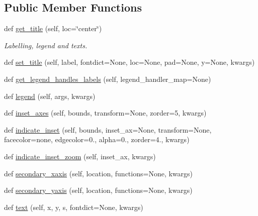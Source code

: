 \subsection*{Public Member Functions}
\begin{DoxyCompactItemize}
\item 
def \hyperlink{classmatplotlib_1_1axes_1_1__axes_1_1Axes_a4c96d26db49ace6f5d6aba17d9c0e013}{get\+\_\+title} (self, loc=\char`\"{}center\char`\"{})
\begin{DoxyCompactList}\small\item\em Labelling, legend and texts. \end{DoxyCompactList}\item 
def \hyperlink{classmatplotlib_1_1axes_1_1__axes_1_1Axes_ae727bef0fa6139389f8120c77bfb2569}{set\+\_\+title} (self, label, fontdict=None, loc=None, pad=None, y=None, kwargs)
\item 
def \hyperlink{classmatplotlib_1_1axes_1_1__axes_1_1Axes_add61aed0b1d4ca9f678649bf8c580b01}{get\+\_\+legend\+\_\+handles\+\_\+labels} (self, legend\+\_\+handler\+\_\+map=None)
\item 
def \hyperlink{classmatplotlib_1_1axes_1_1__axes_1_1Axes_ab65185112f483952ebabe22cbf39e43e}{legend} (self, args, kwargs)
\item 
def \hyperlink{classmatplotlib_1_1axes_1_1__axes_1_1Axes_aa7210b72a2a1b8d0d8d29b5d425bf228}{inset\+\_\+axes} (self, bounds, transform=None, zorder=5, kwargs)
\item 
def \hyperlink{classmatplotlib_1_1axes_1_1__axes_1_1Axes_ac467617ba416b91463837b2963cdc605}{indicate\+\_\+inset} (self, bounds, inset\+\_\+ax=None, transform=None, facecolor=\textquotesingle{}none\textquotesingle{}, edgecolor=\textquotesingle{}0.\textquotesingle{}, alpha=0., zorder=4., kwargs)
\item 
def \hyperlink{classmatplotlib_1_1axes_1_1__axes_1_1Axes_a143f187ab0e609daaa6b4830895409bd}{indicate\+\_\+inset\+\_\+zoom} (self, inset\+\_\+ax, kwargs)
\item 
def \hyperlink{classmatplotlib_1_1axes_1_1__axes_1_1Axes_a84739deeaddd9d660f15a597e1892d04}{secondary\+\_\+xaxis} (self, location, functions=None, kwargs)
\item 
def \hyperlink{classmatplotlib_1_1axes_1_1__axes_1_1Axes_acf4a04410d25a648d77e2eb3045a2669}{secondary\+\_\+yaxis} (self, location, functions=None, kwargs)
\item 
def \hyperlink{classmatplotlib_1_1axes_1_1__axes_1_1Axes_a73ed6fed1fd809148b1fb6936b993dbe}{text} (self, x, y, s, fontdict=None, kwargs)

\end{DoxyCompactItemize}
